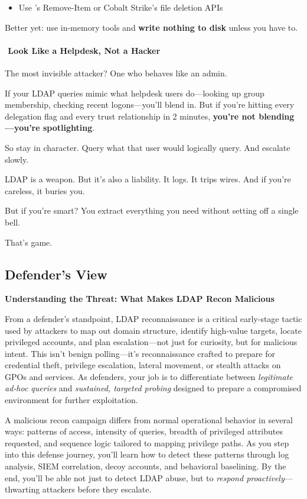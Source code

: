 {{\begin{itemize}
    \item Use  ’s Remove-Item or Cobalt Strike’s file deletion APIs

\end{itemize}
Better yet: use in-memory tools and \textbf{write nothing to disk} unless you have to.

\paragraph{\textbf{  ️ Look Like a Helpdesk, Not a Hacker}}

The most invisible attacker? One who behaves like an admin.

If your LDAP queries mimic what helpdesk users do—looking up group membership, checking recent logons—you’ll blend in. But if you’re hitting every delegation flag and every trust relationship in 2 minutes, \textbf{you’re not blending—you’re spotlighting}.

So stay in character. Query what that user would logically query. And escalate slowly.

LDAP is a weapon. But it’s also a liability. It logs. It trips wires. And if you’re careless, it buries you.

But if you’re smart? You extract everything you need without setting off a single bell.

That’s game.

\subsection{\textbf{Defender’s View}}

\textbf{Understanding the Threat: What Makes LDAP Recon Malicious}

From a defender’s standpoint, LDAP reconnaissance is a critical early-stage tactic used by attackers to map out domain structure, identify high‑value targets, locate privileged accounts, and plan escalation—not just for curiosity, but for malicious intent. This isn’t benign polling—it’s reconnaissance crafted to prepare for credential theft, privilege escalation, lateral movement, or stealth attacks on GPOs and services. As defenders, your job is to differentiate between \textit{legitimate ad‑hoc queries} and \textit{sustained, targeted probing} designed to prepare a compromised environment for further exploitation.

A malicious recon campaign differs from normal operational behavior in several ways: patterns of access, intensity of queries, breadth of privileged attributes requested, and sequence logic tailored to mapping privilege paths. As you step into this defense journey, you’ll learn how to detect these patterns through log analysis, SIEM correlation, decoy accounts, and behavioral baselining. By the end, you’ll be able not just to detect LDAP abuse, but to \textit{respond proactively}—thwarting attackers before they escalate.

}}
